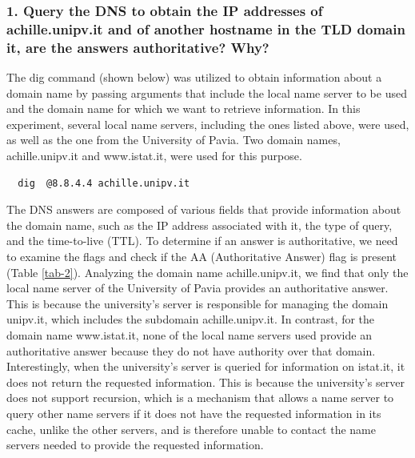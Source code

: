 \documentclass[eng]{class}
\begin{document}
\subsubsection*{1. Query the DNS to obtain the IP addresses of achille.unipv.it and of another hostname in the TLD domain it, are the answers authoritative? Why?}
The dig command (shown below) was utilized to obtain information about a domain name by passing arguments that include the local name server
to be used and the domain name for which we want to retrieve information.
In this experiment, several local name servers, including the ones listed above, were used, as well as the one from the University of Pavia.
Two domain names, achille.unipv.it and www.istat.it, were used for this purpose.
\begin{lstlisting}
  dig  @8.8.4.4 achille.unipv.it
\end{lstlisting}
The DNS answers are composed of various fields that provide information about the domain name, such as the IP address associated with it,
the type of query, and the time-to-live (TTL). \newline
To determine if an answer is authoritative, we need to examine the flags and check if the AA (Authoritative Answer) flag is present (Table \ref*{tab-2}).
Analyzing the domain name achille.unipv.it, we find that only the local name server of the University of Pavia provides an authoritative answer.
This is because the university's server is responsible for managing the domain unipv.it, which includes the subdomain achille.unipv.it.
In contrast, for the domain name www.istat.it, none of the local name servers used provide an authoritative answer because they do not have authority over that domain.\newline
Interestingly, when the university's server is queried for information on istat.it, it does not return the requested information.
This is because the university's server does not support recursion, which  is a mechanism that allows a name server to query other name servers if it does not have the requested information in its cache, unlike the other servers,
and is therefore unable to contact the name servers needed to provide the requested information.
\end{document}
